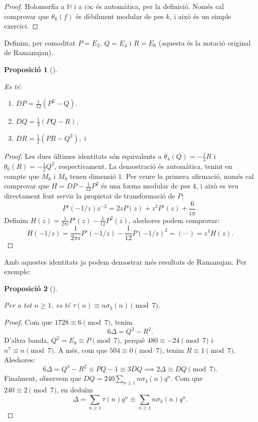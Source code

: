 \documentclass[
  letterpaper,
  DIV=11,
  numbers=noendperiod]{scrreprt}
\providecommand{\tightlist}{%
  \setlength{\itemsep}{0pt}\setlength{\parskip}{0pt}}\usepackage{longtable,booktabs,array}
\theoremstyle{plain}
\theoremstyle{plain}
\theoremstyle{definition}
\theoremstyle{plain}
\newtheorem{proposition}{Proposició}[chapter]
\theoremstyle{plain}
\theoremstyle{definition}
\theoremstyle{remark}
\begin{document}
\begin{proof}
Holomorfia a \(\mathbb{H}\) i a \(i\infty\) és automàtica, per la
definició. Només cal comprovar que \(\theta_k(f)\) és dèbilment modular
de pes \(k\), i això és un simple exercici.
\end{proof}

Definim, per comoditat \(P=E_2\), \(Q=E_4\) i \(R=E_6\) (aquesta és la
notació original de Ramanujan).

\begin{proposition}[]\protect\hypertarget{prp-}{}\label{prp-}

Es té:

\begin{enumerate}
\def\labelenumi{\arabic{enumi}.}
\tightlist
\item
  \(DP = \frac{1}{12}(P^2-Q)\).
\item
  \(DQ = \frac{1}{3}(PQ-R)\),
\item
  \(DR = \frac{1}{2}(PR-Q^2)\), i
\end{enumerate}

\end{proposition}

\begin{proof}
Les dues últimes identitats són equivalents a
\(\theta_4(Q) = -\frac{1}{3}R\) i \(\theta_6(R)=-\frac{1}{2}Q^2\),
respectivament. La demostració és automàtica, tenint en compte que
\(M_6\) i \(M_8\) tenen dimensió \(1\). Per veure la primera afirmació,
només cal comprovar que \(H = DP-\frac{1}{12}P^2\) és una forma modular
de pes \(4\), i això es veu directament fent servir la propietat de
transformació de \(P\): \[
P'(-1/z)z^{-2} = 2zP(z)+z^2P'(z)+\frac{6}{i\pi}.
\] Definim \(H(z) = \frac{1}{2\pi i} P'(z) -\frac{1}{12}P^2(z)\),
aleshores podem comprovar: \[
H(-1/z) = \frac{1}{2\pi i} P'(-1/z) -\frac{1}{12}P(-1/z)^2 = (\cdots) = z^4 H(z).
\]
\end{proof}

Amb aquestes identitats ja podem demostrar més resultats de Ramanujan.
Per exemple:

\begin{proposition}[]\protect\hypertarget{prp-}{}\label{prp-}

Per a tot \(n\geq 1\), es té \(\tau(n) \equiv n\sigma_3(n)\pmod 7\).

\end{proposition}

\begin{proof}
Com que \(1728\equiv 6\pmod 7\), tenim \[
6\Delta = Q^3-R^2.
\] D'altra banda, \(Q^2=E_8\equiv P\pmod 7\), perquè
\(480\equiv -24\pmod 7\) i \(n^{7}\equiv n\pmod 7\). A més, com que
\(504\equiv 0\pmod 7\), tenim \(R\equiv 1\pmod{7}\). Aleshores: \[
6\Delta = Q^3-R^2\equiv PQ-1 \equiv 3DQ\implies 2\Delta\equiv DQ \pmod 7.
\] Finalment, observem que \(DQ = 240\sum_{n\geq 1} n \sigma_3(n)q^n\).
Com que \(240\equiv 2\pmod 7\), en deduïm \[
\Delta =\sum_{n\geq 1}\tau(n)q^n\equiv \sum_{n\geq 1} n\sigma_3(n)q^n.
\]
\end{proof}
\end{document}
